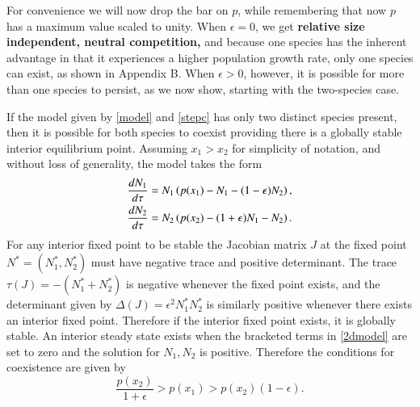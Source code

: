 For convenience we will now drop the bar on $p$, while remembering that now $p$ has a maximum value scaled to unity. When $\epsilon=0$, we get \textbf{relative size independent, neutral competition,} and because one species has the inherent advantage in that it experiences a higher population growth rate, only one species can exist, as shown in Appendix B.
When $\epsilon>0$, however, it is possible for more than one species to persist, as we now show, starting with the two-species case.

If the model given by \eqref{model} and \eqref{stepc} has only two distinct species present, then it is possible for both species to coexist providing there is a globally stable interior equilibrium point. Assuming $x_1>x_2$ for simplicity of notation, and without loss of generality, the model takes the form
\begin{align}
\label{2dmodel}
\frac{d N_{1}}{d\tau}&=N_{1}\left(p(x_1)-N_{1}-(1-\epsilon)N_{2}\right), \notag \\
\frac{d N_{2}}{d\tau}&=N_{2} \left(p(x_2)-(1+\epsilon)N_{1}-N_{2}\right).
\end{align}
For any interior fixed point to be stable the Jacobian matrix $J$ at the fixed point $N^*=(N_{1}^*,N_{2}^*)$ must have negative trace and positive determinant. The trace $\tau(J)=-(N_{1}^*+N_{2}^*)$ is negative whenever the fixed point exists, and the determinant given by $\Delta(J)=\epsilon^2 N_{1}^* N_{2}^*$ is similarly positive whenever there exists an interior fixed point. Therefore if the interior fixed point exists, it is globally stable. An interior steady state exists when the bracketed terms in \eqref{2dmodel} are set to zero and the solution for $N_{1},N_{2}$ is positive. Therefore the conditions for coexistence are given by
\begin{equation}
\label{2dcond}
\frac{p(x_2)}{1+\epsilon}>p(x_1)>p(x_2)(1-\epsilon).
\end{equation}

